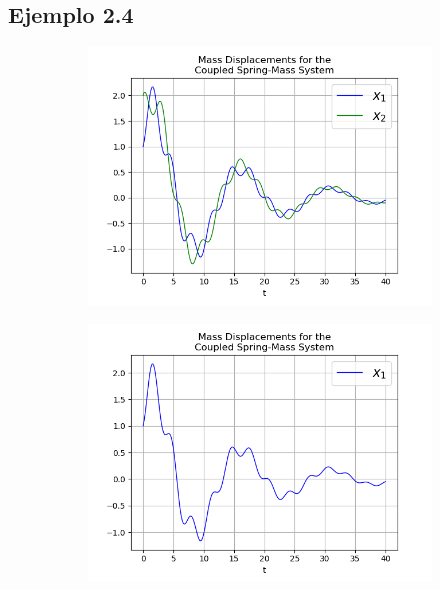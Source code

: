 \documentclass{article}
\begin{document}
\subsection*{Ejemplo 2.4}

\begin{figure}[h!]
  \centering
  \begin{subfigure}[b]{0.32\linewidth}
    \includegraphics[width=\linewidth]{two_springs241.png}
     \caption{}
  \end{subfigure}
  \begin{subfigure}[b]{0.32\linewidth}
    \includegraphics[width=\linewidth]{two_springs242.png}
    \caption{}
  \end{subfigure}
  \begin{subfigure}[b]{0.32\linewidth}

\end{subfigure}
\end{figure}
\end{document}
